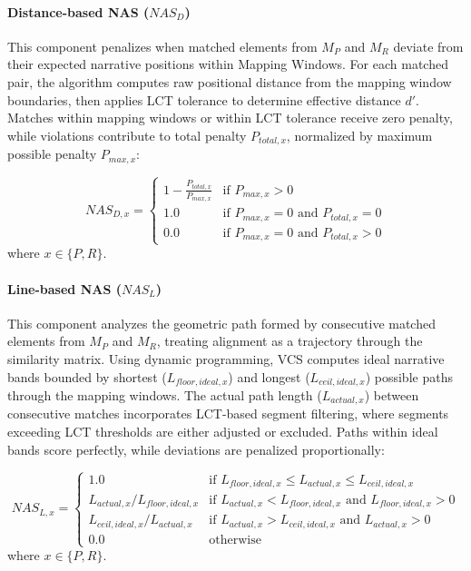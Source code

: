 \documentclass[letterpaper]{article} %
\begin{document}
\paragraph{Distance-based NAS ($NAS_D$)}
This component penalizes when matched elements from $M_P$ and $M_R$ deviate from their expected narrative positions within Mapping Windows. For each matched pair, the algorithm computes raw positional distance from the mapping window boundaries, then applies LCT tolerance to determine effective distance $d'$. Matches within mapping windows or within LCT tolerance receive zero penalty, while violations contribute to total penalty $P_{total,x}$, normalized by maximum possible penalty $P_{max,x}$:

\begin{equation} \label{eq:nas_dx_revised}
NAS_{D,x} =
\begin{cases}
1 - \frac{P_{total,x}}{P_{max,x}} & \text{if } P_{max,x} > 0 \\
1.0 & \text{if } P_{max,x} = 0 \text{ and } P_{total,x} = 0 \\
0.0 & \text{if } P_{max,x} = 0 \text{ and } P_{total,x} > 0
\end{cases}
\end{equation}
where $x \in \{P, R\}$.

\paragraph{Line-based NAS ($NAS_L$)}
This component analyzes the geometric path formed by consecutive matched elements from $M_P$ and $M_R$, treating alignment as a trajectory through the similarity matrix. Using dynamic programming, VCS computes ideal narrative bands bounded by shortest ($L_{floor,ideal,x}$) and longest ($L_{ceil,ideal,x}$) possible paths through the mapping windows. The actual path length ($L_{actual,x}$) between consecutive matches incorporates LCT-based segment filtering, where segments exceeding LCT thresholds are either adjusted or excluded. Paths within ideal bands score perfectly, while deviations are penalized proportionally:

\begin{equation} \label{eq:nas_lx_revised}
NAS_{L,x} =
\begin{cases}
1.0 & \text{if } L_{floor,ideal,x} \leq L_{actual,x} \leq L_{ceil,ideal,x} \\
L_{actual,x} / L_{floor,ideal,x} & \text{if } L_{actual,x} < L_{floor,ideal,x} \text{ and } L_{floor,ideal,x} > 0 \\
L_{ceil,ideal,x} / L_{actual,x} & \text{if } L_{actual,x} > L_{ceil,ideal,x} \text{ and } L_{actual,x} > 0 \\
0.0 & \text{otherwise}
\end{cases}
\end{equation}
where $x \in \{P, R\}$.
\end{document}

